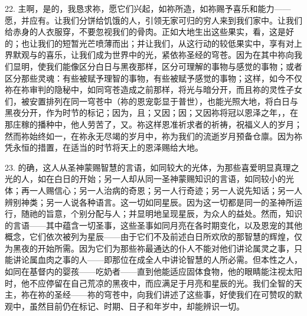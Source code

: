 22. 主啊，是的，我恳求祢，愿它们兴起，如祢所造，如祢赐予喜乐和能力——愿，并应有。让我们分饼给饥饿的人，引领无家可归的穷人来到我们家中。让我们给赤身的人衣服穿，不要忽视我们的骨肉。正如大地生出这些果实，看，这是好的；也让我们的短暂光芒喷薄而出；并让我们，从这行动的较低果实中，享有对上界默观与的喜乐，让我们成为世界中的光，紧依祢圣经的穹苍。因为在其中祢向我们显明，使我们能像区分白日与黑夜那样，区分可理解的事物与感觉的事物；或者区分那些灵魂：有些被赋予理智的事物，有些被赋予感觉的事物；这样，如今不仅祢在祢审判的隐秘中，如同穹苍造成之前那样，将光与暗分开，而且祢的灵性子女们，被安置排列在同一穹苍中（祢的恩宠彰显于普世），也能光照大地，将白日与黑夜分开，作为时节的标记；因为，且；又因；因；又因祢将冠以恩泽之年，，在那庄稼的播种中，他人劳苦了，又。祢这样恩准祈求者的祈祷，祝福义人的岁月；然而祢始终如一，在祢永无尽竭的岁月中，祢为我们的流逝岁月预备仓廪。因为祢凭永恒的措置，在适当的时节将天上的恩泽赐给大地。\par

23. 的确，这人从圣神蒙赐智慧的言语，如同较大的光体，为那些喜爱明显真理之光的人，如在白日的开始；另一人却从同一圣神蒙赐知识的言语，如同较小的光体；再一人赐信心；另一人治病的奇恩；另一人行奇迹；另一人说先知话；另一人辨别神类；另一人说各种语言。这一切如同星辰。因为这一切都是同一的圣神所运行，随祂的旨意，个别分配与人；并显明地呈现星辰，为众人的益处。然而，知识的言语——其中蕴含一切圣事，这些圣事如同月亮在各时期变化，以及恩宠的其他概念，它们依次被列为星辰——由于它们不及前述白日所欢欣的那智慧的辉煌，仅为黑夜的开始所需。因为它们为那些祢最通达的仆人不能对他们讲论属灵之事，只能讲论属血肉之事的人——即那位在成全人中讲论智慧的人所必需。但本性之人，如同在基督内的婴孩——吃奶者——直到他能适应固体食物，他的眼睛能注视太阳时，他不应停留在自己荒凉的黑夜中，而应满足于月亮和星辰的光。我们全智的天主，祢在祢的圣经——祢的穹苍中，向我们讲述了这些事，好使我们在可赞叹的默观中，虽然目前仍在标记、时期、日子和年岁中，却能辨识一切。\par


